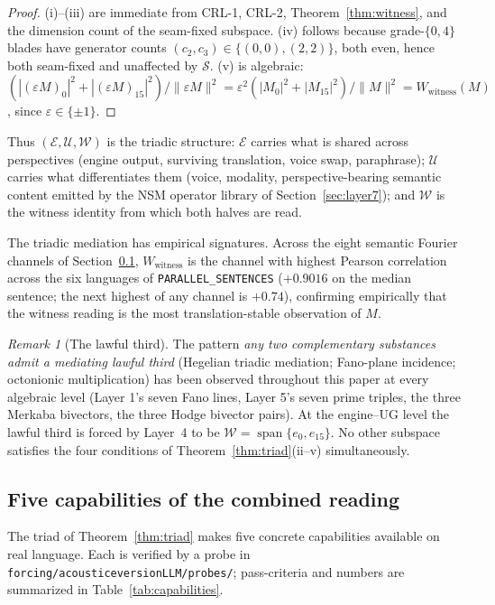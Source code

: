 \documentclass[11pt,a4paper]{article}
\theoremstyle{plain}
\theoremstyle{definition}
\theoremstyle{remark}
\newtheorem{remark}[theorem]{Remark}
\numberwithin{equation}{section}
\providecommand{\eps}{\varepsilon}
\DeclareMathOperator{\Span}{span}
\begin{document}
\begin{proof}
(i)--(iii) are immediate from CRL-1, CRL-2,
Theorem~\ref{thm:witness}, and the dimension count of the
seam-fixed subspace.  (iv) follows because grade-$\{0,4\}$ blades
have generator counts $(c_2, c_3) \in \{(0,0), (2,2)\}$, both even,
hence both seam-fixed and unaffected by $\mathcal{S}$.  (v) is
algebraic: $(|(\eps M)_0|^2 + |(\eps M)_{15}|^2) / \|\eps M\|^2 =
\eps^2 (|M_0|^2 + |M_{15}|^2) / \|M\|^2 =
W_{\mathrm{witness}}(M)$, since $\eps \in \{\pm 1\}$.
\end{proof}

Thus $(\mathcal{E}, \mathcal{U}, \mathcal{W})$ is the triadic
structure: $\mathcal{E}$ carries what is shared across
perspectives (engine output, surviving translation, voice swap,
paraphrase); $\mathcal{U}$ carries what differentiates them (voice,
modality, perspective-bearing semantic content emitted by the NSM
operator library of Section~\ref{sec:layer7}); and $\mathcal{W}$
is the witness identity from which both halves are read.

The triadic mediation has empirical signatures.  Across the eight
semantic Fourier channels of Section~\ref{sec:capabilities},
$W_{\mathrm{witness}}$ is the channel with highest Pearson
correlation across the six languages of \texttt{PARALLEL\_SENTENCES}
($+0.9016$ on the median sentence; the next highest of any channel
is $+0.74$), confirming empirically that the witness reading is
the most translation-stable observation of $M$.

\begin{remark}[The lawful third]\label{rem:lawful-third}
The pattern \emph{any two complementary substances admit a
mediating lawful third} (Hegelian triadic mediation; Fano-plane
incidence; octonionic multiplication) has been observed
throughout this paper at every algebraic level (Layer 1's seven
Fano lines, Layer 5's seven prime triples, the three Merkaba
bivectors, the three Hodge bivector pairs).  At the engine--UG
level the lawful third is forced by Layer~4 to be
$\mathcal{W} = \Span\{e_0, e_{15}\}$.  No other subspace satisfies
the four conditions of Theorem~\ref{thm:triad}(ii--v) simultaneously.
\end{remark}

\subsection{Five capabilities of the combined reading}
\label{sec:capabilities}

The triad of Theorem~\ref{thm:triad} makes five concrete
capabilities available on real language.  Each is verified by a
probe in
\texttt{forcing/acousticeversionLLM/probes/}; pass-criteria and
numbers are summarized in Table~\ref{tab:capabilities}.
\end{document}
